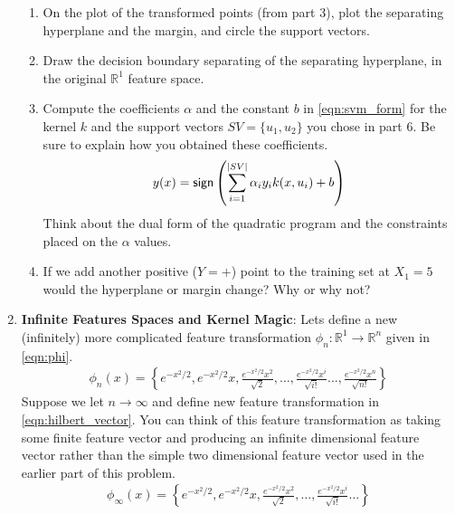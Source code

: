 \begin{enumerate}
\begin{enumerate}
  \item {} On the plot of the transformed points (from part
    3), plot the separating hyperplane and the margin, and circle the
    support vectors.

  \item {} Draw the decision boundary separating of the
    separating hyperplane, in the original $\mathbb{R}^1$ feature
    space.

  
  \item {} Compute the coefficients $\alpha$ and the constant
    $b$ in \autoref{eqn:svm_form} for the kernel $k$ and the support
    vectors $SV=\{u_1,u_2\}$ you chose in part 6.  Be sure to explain
    how you obtained these coefficients.
    \begin{eqnarray}
      y(x) = \textsf{sign} \left( \sum_{i=1}^{|SV|} \alpha_i y_i k(x, u_i) + b \right)
      \label{eqn:svm_form}
    \end{eqnarray}
    Think about the dual form of the quadratic program and the
    constraints placed on the $\alpha$ values.


  \item {} If we add another positive ($Y=+$) point to the
    training set at $X_1=5$ would the hyperplane or margin change?
    Why or why not?
  \end{enumerate}
  
\item \textbf{Infinite Features Spaces and Kernel Magic}: Lets define
  a new (infinitely) more complicated feature transformation
  $\phi_n:\mathbb{R}^1 \rightarrow \mathbb{R}^n$ given in
  \autoref{eqn:phi}.
  \begin{eqnarray}
    \phi_n(x) = \left\{ e^{-x^2/2}, e^{-x^2/2} x, \frac{e^{-x^2/2}x^2}{\sqrt{2}},
    \ldots,
    \frac{e^{-x^2/2}x^i}{\sqrt{i!}}
    \ldots,
    \frac{e^{-x^2/2}x^n}{\sqrt{n!}}
    \right\}
    \label{eqn:phi}
  \end{eqnarray}
  Suppose we let $n \rightarrow \infty$ and define new feature
  transformation in \autoref{eqn:hilbert_vector}.  You can think of
  this feature transformation as taking some finite feature vector and
  producing an infinite dimensional feature vector rather than the
  simple two dimensional feature vector used in the earlier part of
  this problem.
  \begin{eqnarray}
    \phi_{\infty}(x) = \left\{ e^{-x^2/2}, e^{-x^2/2} x,
    \frac{e^{-x^2/2}x^2}{\sqrt{2}},
    \ldots,
    \frac{e^{-x^2/2}x^i}{\sqrt{i!}}
    \ldots
    \right\}
    \label{eqn:hilbert_vector}
  \end{eqnarray}
  

\end{enumerate}
